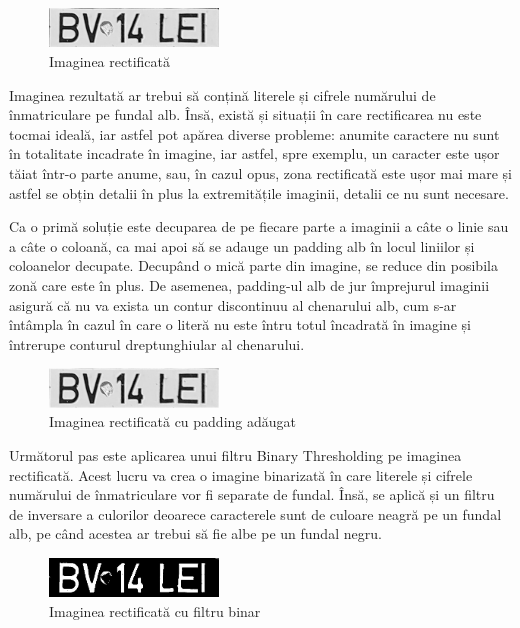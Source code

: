 \documentclass[a4paper,12pt]{report}
\begin{document}
\begin{figure}[h]
    \centering
    \includegraphics[width=0.4\textwidth]{images/transformed.jpg}
    \caption{Imaginea rectificată}
\end{figure}
\FloatBarrier

Imaginea rezultată ar trebui să conțină literele și cifrele numărului de înmatriculare pe fundal alb. Însă, există și situații în care rectificarea nu este tocmai ideală, iar astfel pot apărea diverse probleme: anumite caractere nu sunt în totalitate incadrate în imagine, iar astfel, spre exemplu, un caracter este ușor tăiat într-o parte anume, sau, în cazul opus, zona rectificată este ușor mai mare și astfel se obțin detalii în plus la extremitățile imaginii, detalii ce nu sunt necesare.

Ca o primă soluție este decuparea de pe fiecare parte a imaginii a câte o linie sau a câte o coloană, ca mai apoi să se adauge un padding alb în locul liniilor și coloanelor decupate. Decupând o mică parte din imagine, se reduce din posibila zonă care este în plus. De asemenea, padding-ul alb de jur împrejurul imaginii asigură că nu va exista un contur discontinuu al chenarului alb, cum s-ar întâmpla în cazul în care o literă nu este întru totul încadrată în imagine și întrerupe conturul dreptunghiular al chenarului.

\begin{figure}[h]
    \centering
    \includegraphics[width=0.4\textwidth]{images/boardered.jpg}
    \caption{Imaginea rectificată cu padding adăugat}
\end{figure}
\FloatBarrier

Următorul pas este aplicarea unui filtru Binary Thresholding pe imaginea rectificată. Acest lucru va crea o imagine binarizată în care literele și cifrele numărului de înmatriculare vor fi separate de fundal. Însă, se aplică și un filtru de inversare a culorilor deoarece caracterele sunt de culoare neagră pe un fundal alb, pe când acestea ar trebui să fie albe pe un fundal negru.

\begin{figure}[h]
    \centering
    \includegraphics[width=0.4\textwidth]{images/text.jpg}
    \caption{Imaginea rectificată cu filtru binar}
\end{figure}
\FloatBarrier
\end{document}
